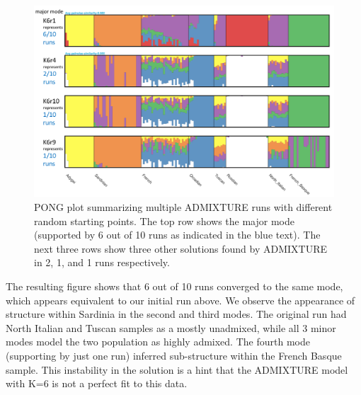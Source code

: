 \documentclass[smallextended]{svjour3}       %
\newenvironment{Shaded}{\begin{snugshade}}{\end{snugshade}}
\newcommand{\KeywordTok}[1]{\textcolor[rgb]{0.13,0.29,0.53}{\textbf{#1}}}
\newcommand{\DataTypeTok}[1]{\textcolor[rgb]{0.13,0.29,0.53}{#1}}
\newcommand{\StringTok}[1]{\textcolor[rgb]{0.31,0.60,0.02}{#1}}
\newcommand{\CommentTok}[1]{\textcolor[rgb]{0.56,0.35,0.01}{\textit{#1}}}
\newcommand{\FunctionTok}[1]{\textcolor[rgb]{0.00,0.00,0.00}{#1}}
\newcommand{\VariableTok}[1]{\textcolor[rgb]{0.00,0.00,0.00}{#1}}
\newcommand{\OperatorTok}[1]{\textcolor[rgb]{0.81,0.36,0.00}{\textbf{#1}}}
\newcommand{\ExtensionTok}[1]{#1}
\newcommand{\NormalTok}[1]{#1}
\begin{document}
\begin{Shaded}
\end{Shaded}

\begin{figure}
\includegraphics[width=1\linewidth]{./plot/H938_Euro_LDprune_K6_10runs} \caption{PONG plot summarizing multiple ADMIXTURE runs with different random starting points.  The top row shows the major mode (supported by 6 out of 10 runs as indicated in the blue text).  The next three rows show three other solutions found by ADMIXTURE in 2, 1, and 1 runs respectively.}\label{fig:unnamed-chunk-10}
\end{figure}

The resulting figure shows that 6 out of 10 runs converged to the same
mode, which appears equivalent to our initial run above. We observe the
appearance of structure within Sardinia in the second and third modes.
The original run had North Italian and Tuscan samples as a mostly
unadmixed, while all 3 minor modes model the two population as highly
admixed. The fourth mode (supporting by just one run) inferred
sub-structure within the French Basque sample. This instability in the
solution is a hint that the ADMIXTURE model with K=6 is not a perfect
fit to this data.
\end{document}
